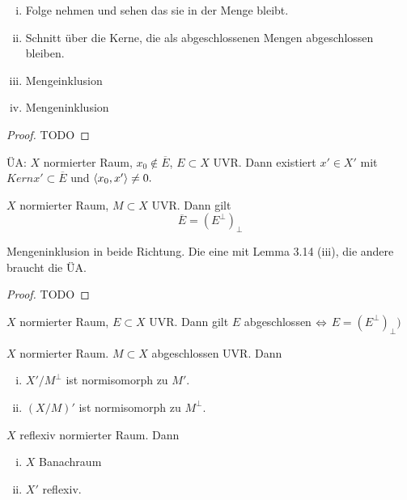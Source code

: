 \documentclass[ngerman]{report}
\begin{document}
	\begin{hinweise}
			\begin{enumerate}[(i)]
				\item Folge nehmen und sehen das sie in der Menge bleibt.
				\item Schnitt über die Kerne, die als abgeschlossenen Mengen abgeschlossen bleiben.
				\item Mengeinklusion
				\item Mengeninklusion
			\end{enumerate}
	\end{hinweise}

	\begin{proof}
		TODO
	\end{proof}

	ÜA: $X$ normierter Raum, $x_0 \not\in \overline{E}$, $E\subset X$ UVR. Dann existiert $x' \in X'$ mit  $Kern x' \subset \overline{E}$ und $\left \langle x_0, x' \right \rangle \neq 0.$

	\begin{thm} $X$ normierter Raum, $M \subset X$ UVR. Dann gilt 
		$$\overline{E} = (E^\perp)_\perp $$
	\end{thm}

	\begin{hinweise}
		Mengeninklusion in beide Richtung. Die eine mit Lemma 3.14 (iii), die andere braucht die ÜA. 
	\end{hinweise}

	\begin{proof}
		TODO
	\end{proof}

	\begin{cor} 
		$X$ normierter Raum, $E\subset X$ UVR. Dann gilt $E$ abgeschlossen $\overset{}{\Leftrightarrow}$	$ E = (E^\perp)_\perp)$
	\end{cor}

	\begin{thm}[Übung]
		$X$ normierter Raum. $M \subset X$ abgeschlossen UVR. Dann 
					\begin{enumerate}[(i)]
						\item $X' / M^\perp$ ist normisomorph zu $M'$.
						\item $(X / M)'$ ist normisomorph zu $M^\perp$.
					\end{enumerate}
	\end{thm}

	\begin{thm}
		$X$ reflexiv normierter Raum. Dann
					\begin{enumerate}[(i)]
						\item $X$ Banachraum
						\item $X'$ reflexiv.
					\end{enumerate}

	\end{thm}
\end{document}
